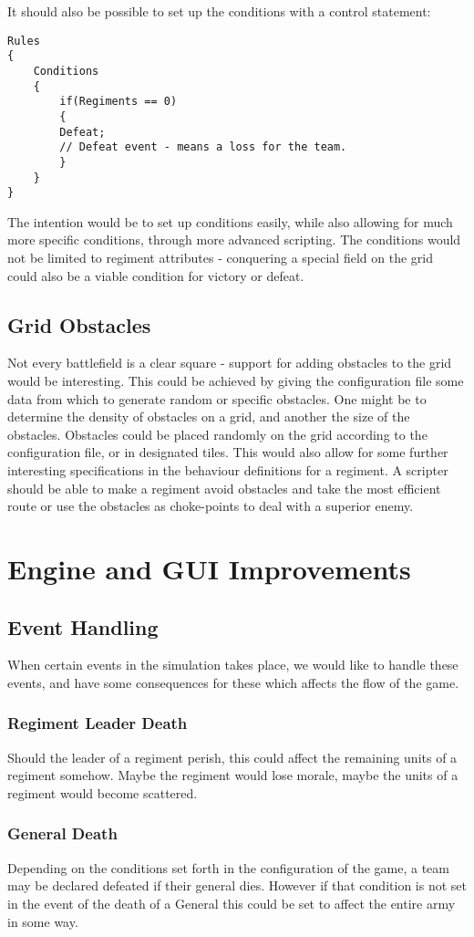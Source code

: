 It should also be possible to set up the conditions with a control statement:
\begin{lstlisting}
Rules
{
	Conditions
	{
		if(Regiments == 0)
		{
		Defeat; 
		// Defeat event - means a loss for the team.
		}
	}
}
\end{lstlisting}
The intention would be to set up conditions easily, while also allowing for much more specific conditions, through more advanced scripting. The conditions would not be limited to regiment attributes - conquering a special field on the grid could also be a viable condition for victory or defeat.
\subsection{Grid Obstacles}
Not every battlefield is a clear square - support for adding obstacles to the grid would be interesting. This could be achieved by giving the configuration file some data from which to generate random or specific obstacles. One might be to determine the density of obstacles on a grid, and another the size of the obstacles. Obstacles could be placed randomly on the grid according to the configuration file, or in designated tiles. This would also allow for some further interesting specifications in the behaviour definitions for a regiment. A scripter should be able to make a regiment avoid obstacles and take the most efficient route or use the obstacles as choke-points to deal with a superior enemy.
\section{Engine and GUI Improvements}
\subsection{Event Handling}
When certain events in the simulation takes place, we would like to handle these events, and have some consequences for these which affects the flow of the game.
\subsubsection*{Regiment Leader Death}
Should the leader of a regiment perish, this could affect the remaining units of a regiment somehow. Maybe the regiment would lose morale, maybe the units of a regiment would become scattered.
\subsubsection*{General Death}
Depending on the conditions set forth in the configuration of the game, a team may be declared defeated if their general dies. However if that condition is not set in the event of the death of a General this could be set to affect the entire army in some way. 
